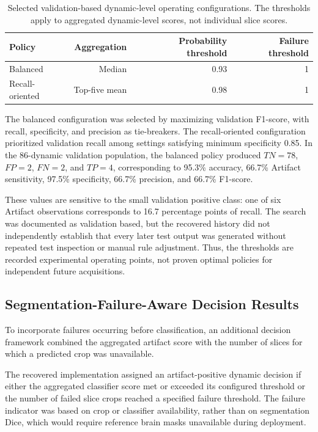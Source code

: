 \begin{table}[htbp]
\centering
\caption{Selected validation-based dynamic-level operating configurations. The thresholds apply to aggregated dynamic-level scores, not individual slice scores.}
\label{tab:results_threshold_configs}
\begin{tabular}{lrrr}
\hline
Policy & Aggregation & Probability threshold & Failure threshold \\
\hline
Balanced & Median & 0.93 & 1 \\
Recall-oriented & Top-five mean & 0.98 & 1 \\
\hline
\end{tabular}
\end{table}

The balanced configuration was selected by maximizing validation F1-score, with recall, specificity, and precision as tie-breakers. The recall-oriented configuration prioritized validation recall among settings satisfying minimum specificity 0.85. In the 86-dynamic validation population, the balanced policy produced $TN=78$, $FP=2$, $FN=2$, and $TP=4$, corresponding to 95.3\% accuracy, 66.7\% Artifact sensitivity, 97.5\% specificity, 66.7\% precision, and 66.7\% F1-score.

These values are sensitive to the small validation positive class: one of six Artifact observations corresponds to 16.7 percentage points of recall. The search was documented as validation based, but the recovered history did not independently establish that every later test output was generated without repeated test inspection or manual rule adjustment. Thus, the thresholds are recorded experimental operating points, not proven optimal policies for independent future acquisitions.

\subsection{Segmentation-Failure-Aware Decision Results}
\label{subsec:results_failure_aware_policies}

To incorporate failures occurring before classification, an additional decision framework combined the aggregated artifact score with the number of slices for which a predicted crop was unavailable.

The recovered implementation assigned an artifact-positive dynamic decision if either the aggregated classifier score met or exceeded its configured threshold or the number of failed slice crops reached a specified failure threshold. The failure indicator was based on crop or classifier availability, rather than on segmentation Dice, which would require reference brain masks unavailable during deployment.

